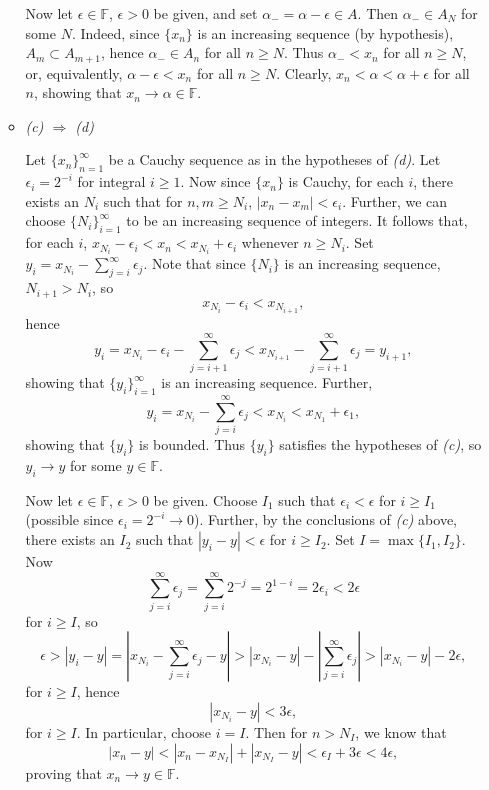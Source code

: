 \documentclass{article}
\begin{document}
\begin{enumerate}
\begin{itemize}
Now let \(\epsilon \in \mathbb{F}\), \(\epsilon > 0\) be given, and set \(\alpha_- = \alpha - \epsilon \in A\).  Then \(\alpha_- \in A_N\) for some \(N\).  Indeed, since \(\{x_n\}\) is an increasing sequence (by hypothesis), \(A_m \subset A_{m + 1}\), hence \(\alpha_- \in A_n\) for all \(n \geq N\).  Thus \(\alpha_- < x_n\) for all \(n \geq N\), or, equivalently, \(\alpha - \epsilon < x_n\) for all \(n \geq N\).  Clearly, \(x_n < \alpha < \alpha + \epsilon\) for all \(n\), showing that \(x_n \to \alpha \in \mathbb{F}\).

\item {\em (c) \(\Rightarrow\) (d)}

Let \(\{x_n\}_{n = 1}^{\infty}\) be a Cauchy sequence as in the hypotheses of {\em (d)}.  Let \(\epsilon_i = 2^{-i}\) for integral \(i \geq 1\).  Now since \(\{x_n\}\) is Cauchy, for each \(i\), there exists an \(N_i\) such that for \(n,m \geq N_i\), \(|x_n - x_m| < \epsilon_i\).  Further, we can choose \(\{N_i\}_{i = 1}^{\infty}\) to be an increasing sequence of integers.  It follows that, for each \(i\), \(x_{N_i} - \epsilon_i < x_n < x_{N_i} + \epsilon_i\) whenever \(n \geq N_i\).  Set \(y_i = x_{N_i} - \sum_{j = i}^{\infty} \epsilon_j\).  Note that since \(\{N_i\}\) is an increasing sequence, \(N_{i + 1} > N_i\), so
\[x_{N_i} - \epsilon_i < x_{N_{i + 1}},\]
hence
\[y_i = x_{N_i} - \epsilon_i - \sum_{j = i + 1}^{\infty} \epsilon_j
      < x_{N_{i + 1}} - \sum_{j = i + 1}^{\infty} \epsilon_j = y_{i + 1},\]
showing that \(\{y_i\}_{i = 1}^{\infty}\) is an increasing sequence.  Further,
\[y_i = x_{N_i} - \sum_{j = i}^{\infty} \epsilon_j < x_{N_i} < x_{N_1} + \epsilon_1,\]
showing that \(\{y_i\}\) is bounded.  Thus \(\{y_i\}\) satisfies the hypotheses of {\em (c)}, so \(y_i \to y\) for some \(y \in \mathbb{F}\).

Now let \(\epsilon \in \mathbb{F}\), \(\epsilon > 0\) be given.  Choose \(I_1\) such that \(\epsilon_i < \epsilon\) for \(i \geq I_1\) (possible since \(\epsilon_i = 2^{-i} \to 0\)).  Further, by the conclusions of {\em (c)} above, there exists an \(I_2\) such that \(|y_i - y| < \epsilon\) for \(i \geq I_2\).  Set \(I = \max \{I_1, I_2\}\).  Now
\[\sum_{j = i}^{\infty} \epsilon_j
  = \sum_{j = i}^{\infty} 2^{-j}
  = 2^{1 - i}
  = 2\epsilon_i
  < 2\epsilon\]
for \(i \geq I\), so
\[\epsilon > |y_i - y|
           = \left| x_{N_i} - \sum_{j = i}^{\infty} \epsilon_j - y \right|
           > \left| x_{N_i} - y \right| - \left| \sum_{j = i}^{\infty} \epsilon_j \right|
           > \left| x_{N_i} - y \right| - 2\epsilon,\]
for \(i \geq I\), hence
\[\left| x_{N_i} - y \right| < 3\epsilon,\]
for \(i \geq I\).  In particular, choose \(i = I\).  Then for \(n > N_I\), we know that
\[|x_n - y| < \left| x_n - x_{N_I} \right| + \left| x_{N_I} - y \right|
            < \epsilon_I + 3\epsilon
            < 4\epsilon,\]
proving that \(x_n \to y \in \mathbb{F}\).


\end{itemize}
\end{enumerate}
\end{document}
